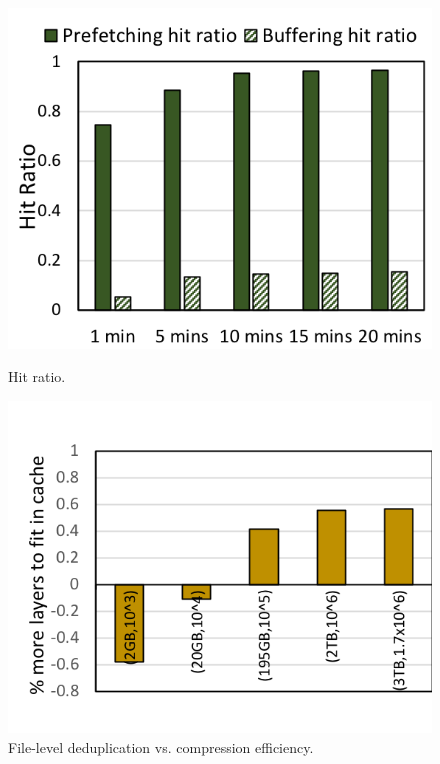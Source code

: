 \begin{figure}[t]
	\centering
		\begin{minipage}{0.23\textwidth}
			\centering
			\includegraphics[width=1\textwidth]{graphs/evaluation_hitratios.png}
			\caption{Hit ratio.}
			\label{fig:hitratio}
		\end{minipage}
		\begin{minipage}{0.24\textwidth}
			\centering
			\includegraphics[width=1\textwidth]{graphs/percentage_morelayers_afterdedup.png}
			\caption{File-level deduplication vs. compression efficiency. }
			\label{fig:cacheefficiency}
		\end{minipage}
\end{figure}